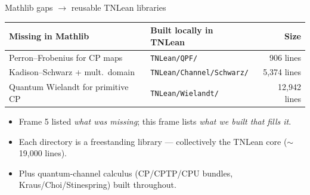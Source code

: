 \documentclass[aspectratio=169,10pt]{beamer}
\begin{document}
\begin{frame}{Mathlib gaps $\to$ reusable TNLean libraries}
    \begin{center}
    \renewcommand{\arraystretch}{1.3}
    {\footnotesize
    \begin{tabular}{@{}l l r@{}}
        \toprule
        \textbf{Missing in Mathlib} & \textbf{Built locally in TNLean} & \textbf{Size} \\
        \midrule
        Perron--Frobenius for CP maps     & \texttt{TNLean/QPF/}                & 906 lines \\
        Kadison--Schwarz + mult.\ domain  & \texttt{TNLean/Channel/Schwarz/}    & 5{,}374 lines \\
        Quantum Wielandt for primitive CP & \texttt{TNLean/Wielandt/}           & 12{,}942 lines \\
        \bottomrule
    \end{tabular}}
    \end{center}
    \vspace{0.6em}
    \begin{itemize}
        \item Frame 5 listed \emph{what was missing}; this frame lists \emph{what we built that fills it}.
        \item Each directory is a freestanding library --- collectively the TNLean core ($\sim$19{,}000 lines).
        \item Plus quantum-channel calculus (CP/CPTP/CPU bundles, Kraus/Choi/Stinespring) built throughout.
    \end{itemize}
\end{frame}
\end{document}
